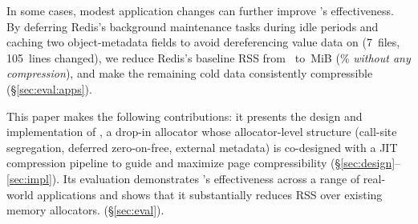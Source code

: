 In some cases, modest application changes can further improve
\sys's effectiveness.  By deferring Redis's background maintenance
tasks during idle periods and caching two object-metadata fields
to avoid dereferencing value data on 
(7~files, 105~lines changed), we reduce Redis's baseline RSS
from \ablRedisBaselineServeRss\ to
\ablRedisPatchedBaselineServeRss\,MiB
(\redisPatchBaselineRedPct\% \emph{without any compression}),
and make the remaining cold data consistently compressible
(\S\ref{sec:eval:apps}).

\noindent
This paper makes the following contributions:
%
  it presents the design and implementation of \sys, a drop-in allocator
  whose allocator-level structure (call-site segregation,
  deferred zero-on-free, external metadata) is co-designed with
  a JIT compression pipeline to guide and maximize page compressibility
  (\S\ref{sec:design}--\ref{sec:impl}).
  Its evaluation demonstrates \sys{}'s effectiveness across a range of real-world applications and shows that it substantially reduces RSS over existing memory allocators.
  (\S\ref{sec:eval}).
